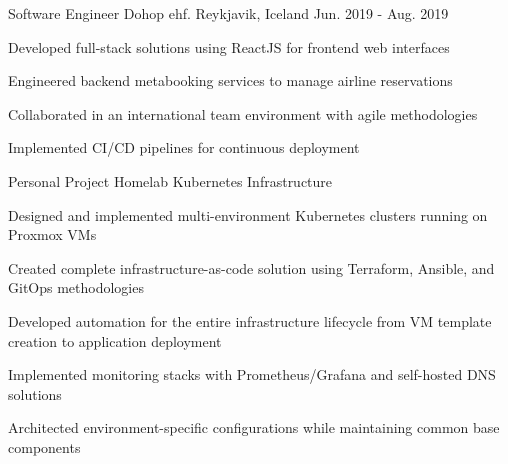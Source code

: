 \documentclass[11pt, a4paper]{awesome-cv}
\begin{document}
\begin{cventries}
  \cventry
    {Software Engineer}
    {Dohop ehf.}
    {Reykjavik, Iceland}
    {Jun. 2019 - Aug. 2019}
    {
      \begin{cvitems}
        \item {Developed full-stack solutions using ReactJS for frontend web interfaces}
        \item {Engineered backend metabooking services to manage airline reservations}
        \item {Collaborated in an international team environment with agile methodologies}
        \item {Implemented CI/CD pipelines for continuous deployment}
      \end{cvitems}
    }

\end{cventries}


\begin{cventries}

  \cventry
    {Personal Project}
    {Homelab Kubernetes Infrastructure}
    {}
    {}
    {
      \begin{cvitems}
        \item {Designed and implemented multi-environment Kubernetes clusters running on Proxmox VMs}
        \item {Created complete infrastructure-as-code solution using Terraform, Ansible, and GitOps methodologies}
        \item {Developed automation for the entire infrastructure lifecycle from VM template creation to application deployment}
        \item {Implemented monitoring stacks with Prometheus/Grafana and self-hosted DNS solutions}
        \item {Architected environment-specific configurations while maintaining common base components}
      \end{cvitems}
    }

\end{cventries}
\end{document}
